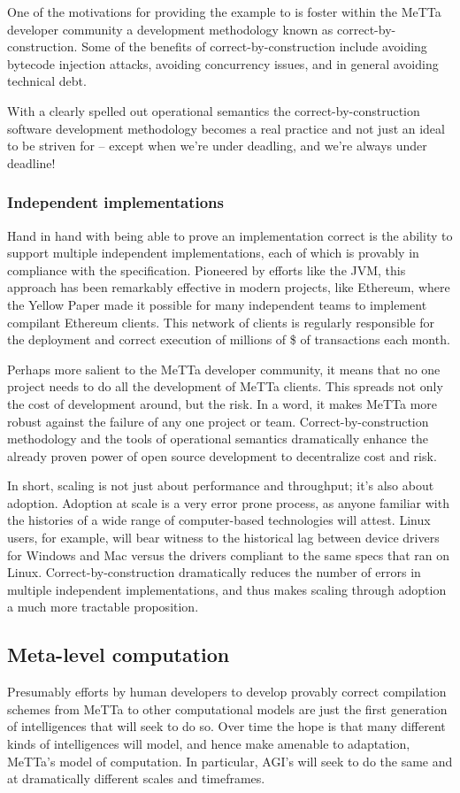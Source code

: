 One of the motivations for providing the example to is foster within the MeTTa developer community a development methodology known as correct-by-construction. Some of the benefits of correct-by-construction include avoiding bytecode injection attacks, avoiding concurrency issues, and in general avoiding technical debt.

With a clearly spelled out operational semantics the correct-by-construction software development methodology becomes a real practice and not just an ideal to be striven for -- except when we're under deadling, and we're always under deadline!

\subsubsection{Independent implementations}
Hand in hand with being able to prove an implementation correct is the ability to support multiple independent implementations, each of which is provably in compliance with the specification. Pioneered by efforts like the JVM, this approach has been remarkably effective in modern projects, like Ethereum, where the Yellow Paper made it possible for many independent teams to implement compilant Ethereum clients. This network of clients is regularly responsible for the deployment and correct execution of millions of \$ of transactions each month.

Perhaps more salient to the MeTTa developer community, it means that no one project needs to do all the development of MeTTa clients. This spreads not only the cost of development around, but the risk. In a word, it makes MeTTa more robust against the failure of any one project or team. Correct-by-construction methodology and the tools of operational semantics dramatically enhance the already proven power of open source development to decentralize cost and risk.

In short, scaling is not just about performance and throughput; it's also about adoption. Adoption at scale is a very error prone process, as anyone familiar with the histories of a wide range of computer-based technologies will attest. Linux users, for example, will bear witness to the historical lag between device drivers for Windows and Mac versus the drivers compliant to the same specs that ran on Linux. Correct-by-construction dramatically reduces the number of errors in multiple independent implementations, and thus makes scaling through adoption a much more tractable proposition.

\subsection{Meta-level computation}
Presumably efforts by human developers to develop provably correct compilation schemes from MeTTa to other computational models are just the first generation of intelligences that will seek to do so. Over time the hope is that many different kinds of intelligences will model, and hence make amenable to adaptation, MeTTa's model of computation. In particular, AGI's will seek to do the same and at dramatically different scales and timeframes. 

